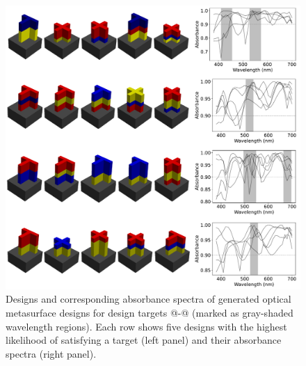 \documentclass{article}
\makeatletter
\newcommand*{\rom}[1]{\expandafter\@slowromancap\romannumeral #1@}
\makeatother
\begin{document}
\begin{appendices}
\begin{figure}
\centering
\includegraphics[width=\textwidth]{fig/support_optical_2.pdf}
\caption{Designs and corresponding absorbance spectra of generated optical metasurface designs for design targets \rom{7}-\rom{10} (marked as gray-shaded wavelength regions). Each row shows five designs with the highest likelihood of satisfying a target (left panel) and their absorbance spectra (right panel). 
}
\label{fig:support_optical_2}
\end{figure}



\end{appendices}
\end{document}
